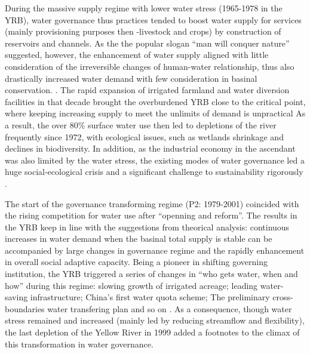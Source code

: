 During the massive supply regime with lower water stress (1965-1978 in the YRB), water governance thus practices tended to boost water supply for services (mainly provisioning purposes then -livestock and crops) by construction of reservoirs and channels.
As the the popular slogan ``man will conquer nature'' suggested, however, the enhancement of water supply aligned with little consideration of the irreversible changes of human-water relationship, thus also drastically increased water demand with few consideration in basinal conservation.
\cite{zhouDecelerationChinahuman2020}.
The rapid expansion of irrigated farmland and water diversion facilities in that decade brought the overburdened YRB close to the critical point, where keeping increasing supply to meet the unlimits of demand is unpractical
As a result, the over 80\% surface water use then led to depletions of the river frequently since 1972, with ecological issues, such as wetlands shrinkage and declines in biodiversity.
In addition, as the industrial economy in the ascendant was also limited by the water stress, the existing modes of water governance led a huge social-ecological crisis and a significant challenge to sustainability rigorously
\cite{wohlfartRiverBasinCourse2016}.

The start of the governance transforming regime (P2: 1979-2001) coincided with the rising competition for water use after ``openning and reform''.
The results in the YRB keep in line with the suggestions from theorical analysis: continuous increases in water demand when the basinal total supply is stable can be accompanied by large changes in governance regime and the rapidly enhancement in overall social adaptive capacity.
Being a pioneer in shifting governing institution, the YRB triggered a series of changes in ``who gets water, when and how'' during this regime: slowing growth of irrigated acreage; leading water-saving infrastructure; China's first water quota scheme; The preliminary cross-boundaries water transfering plan and so on
\cite{wangThirtyYearsYellow2018}.
As a consequence, though water stress remained and increased (mainly led by reducing streamflow and flexibility), the last depletion of the Yellow River in 1999 added a footnotes to the climax of this transformation in water governance.

